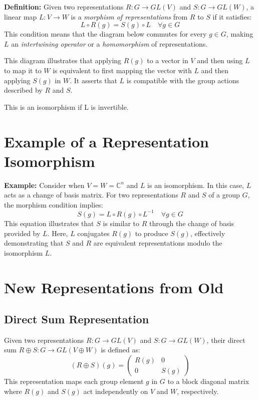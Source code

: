 \documentclass{article}
\begin{document}
\textbf{Definition:} Given two representations \(R: G \to GL(V)\) and \(S: G \to GL(W)\), a linear map \(L: V \to W\) is a \textit{morphism of representations} from \(R\) to \(S\) if it satisfies:
\[
L \circ R(g) = S(g) \circ L \quad \forall g \in G
\]
This condition means that the diagram below commutes for every \(g \in G\), making \(L\) an \textit{intertwining operator} or a \textit{homomorphism} of representations.

\begin{center}
\end{center}

This diagram illustrates that applying \(R(g)\) to a vector in \(V\) and then using \(L\) to map it to \(W\) is equivalent to first mapping the vector with \(L\) and then applying \(S(g)\) in \(W\). It asserts that \(L\) is compatible with the group actions described by \(R\) and \(S\).

This is an isomorphism if L is invertible. 

\section*{Example of a Representation Isomorphism}

\textbf{Example:} Consider when \( V = W = \mathbb{C}^n \) and \( L \) is an isomorphism. In this case, \( L \) acts as a change of basis matrix. For two representations \( R \) and \( S \) of a group \( G \), the morphism condition implies:
\[
S(g) = L \circ R(g) \circ L^{-1} \quad \forall g \in G
\]
This equation illustrates that \( S \) is similar to \( R \) through the change of basis provided by \( L \). Here, \( L \) conjugates \( R(g) \) to produce \( S(g) \), effectively demonstrating that \( S \) and \( R \) are equivalent representations modulo the isomorphism \( L \).

\section{New Representations from Old}

\subsection*{Direct Sum Representation}
Given two representations \( R: G \to GL(V) \) and \( S: G \to GL(W) \), their direct sum \( R \oplus S: G \to GL(V \oplus W) \) is defined as:
\[
(R \oplus S)(g) = \begin{pmatrix} R(g) & 0 \\ 0 & S(g) \end{pmatrix}
\]
This representation maps each group element \( g \) in \( G \) to a block diagonal matrix where \( R(g) \) and \( S(g) \) act independently on \( V \) and \( W \), respectively.
\end{document}

